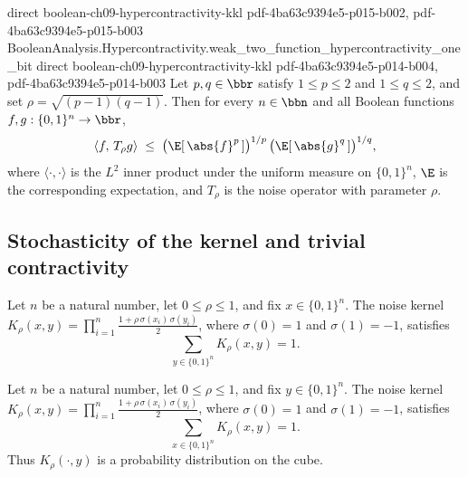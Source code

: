 \begin{theorem}
  {direct}
  {boolean-ch09-hypercontractivity-kkl}
  {pdf-4ba63c9394e5-p015-b002,
    pdf-4ba63c9394e5-p015-b003}
\proofstep
  {BooleanAnalysis.Hypercontractivity.weak_two_function_hypercontractivity_one_bit}
  {direct}
  {boolean-ch09-hypercontractivity-kkl}
  {pdf-4ba63c9394e5-p014-b004,
    pdf-4ba63c9394e5-p014-b003}
Let $p, q \in \bbr$ satisfy $1 \le p \le 2$ and $1 \le q \le 2$, and set $\rho =
\sqrt{(p-1)(q-1)}$. Then for every $n \in \bbn$ and all Boolean functions $f, g :
\{0,1\}^n \to \bbr$,
\[
\langle f,\, T_\rho g\rangle \;\le\;
\bigl(\E[\,\abs{f}^p\,]\bigr)^{1/p}\,\bigl(\E[\,\abs{g}^q\,]\bigr)^{1/q},
\]
where $\langle\cdot,\cdot\rangle$ is the $L^2$ inner product under the uniform measure
on $\{0,1\}^n$, $\E$ is the corresponding expectation, and $T_\rho$ is the noise
operator with parameter $\rho$.
\end{theorem}

\subsection{Stochasticity of the kernel and trivial contractivity}

\begin{lemma}
\label{BooleanAnalysis.Hypercontractivity.noiseKernel_sum_right}
\leanok
{}
Let $n$ be a natural number, let $0\le\rho\le1$, and fix $x\in\{0,1\}^n$.
The noise kernel
$K_\rho(x,y)=\prod_{i=1}^{n}\frac{1+\rho\,\sigma(x_i)\,\sigma(y_i)}{2}$,
where $\sigma(0)=1$ and $\sigma(1)=-1$, satisfies
\[
  \sum_{y\in\{0,1\}^n}K_\rho(x,y)=1.
\]
\end{lemma}

\begin{lemma}
\label{BooleanAnalysis.Hypercontractivity.noiseKernel_sum_left}
\leanok
{}
Let $n$ be a natural number, let $0\le\rho\le1$, and fix $y\in\{0,1\}^n$.
The noise kernel
$K_\rho(x,y)=\prod_{i=1}^{n}\frac{1+\rho\,\sigma(x_i)\,\sigma(y_i)}{2}$,
where $\sigma(0)=1$ and $\sigma(1)=-1$, satisfies
\[
  \sum_{x\in\{0,1\}^n}K_\rho(x,y)=1.
\]
Thus $K_\rho(\cdot,y)$ is a probability distribution on the cube.
\end{lemma}

